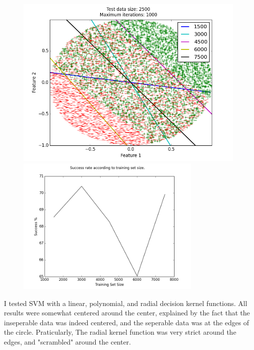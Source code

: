 \documentclass[a4paper]{article}
\begin{document}
\begin{figure}[h!]
    \includegraphics[width=1.0\textwidth]{images/inseperable.png}
    \includegraphics[width=0.8\textwidth]{images/success_rate.png}
\end{figure}

\newpage

I tested SVM with a linear, polynomial, and radial decision kernel functions.
All results were somewhat centered around the center, explained by the fact
that the inseperable data was indeed centered, and the seperable data was at
the edges of the circle. Praticularly, The radial kernel function was very strict
around the edges, and "scrambled" around the center.
\end{document}
